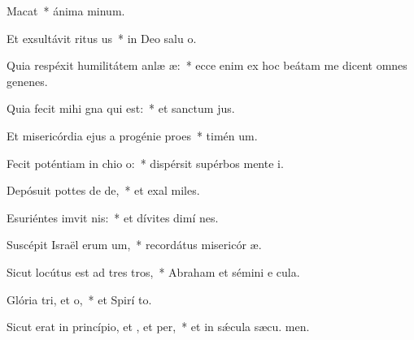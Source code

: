 \item Macat~* ánima  minum.
\item Et exsultávit ritus us~* in Deo salu o.
\item Quia respéxit humilitátem anlæ æ:~* ecce enim ex hoc beátam me dicent omnes genenes.
\item Quia fecit mihi gna qui  est:~* et sanctum  jus.
\item Et misericórdia ejus a progénie  proes~* timén um.
\item Fecit poténtiam in chio o:~* dispérsit supérbos mente  i.
\item Depósuit pottes de de,~* et exal miles.
\item Esuriéntes imvit nis:~* et dívites dimí nes.
\item Suscépit Israël erum um,~* recordátus misericór æ.
\item Sicut locútus est ad tres tros,~* Abraham et sémini e  cula.
\item Glória tri, et o,~* et Spirí to.
\item Sicut erat in princípio, et , et per,~* et in sǽcula sæcu. men.
